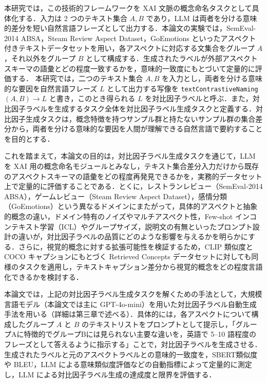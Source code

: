 本研究では，この技術的フレームワークを XAI 文脈の概念命名タスクとして具体化する．入力は 2 つのテキスト集合 $A,B$ であり，LLM は両者を分ける意味的差分を短い自然言語フレーズとして出力する．本論文の実験では，SemEval-2014 ABSA，Steam Review Aspect Dataset，GoEmotions といったアスペクト付きテキストデータセットを用い，各アスペクトに対応する文集合をグループ $A$，それ以外をグループ $B$ として構成する．生成されたラベルが外部アスペクトスキーマの語彙とどの程度一致するかを，意味的一致度にもとづいて定量的に評価する．
本研究では，二つのテキスト集合 $A,B$ を入力とし，両者を分ける意味的な要因を自然言語フレーズ $L$ として出力する写像を \texttt{textContrastiveNaming}$(A,B) \to L$ と書き，このとき得られる $L$ を対比因子ラベルと呼ぶ．また，対比因子ラベルを生成するタスク全体を対比因子ラベル生成タスクと定義する．対比因子生成タスクは，概念特徴を持つサンプル群と持たないサンプル群の集合差分から，両者を分ける意味的な要因を人間が理解できる自然言語で要約することを目的とする．

これを踏まえて，本論文の目的は，対比因子ラベル生成タスクを通じて，LLM を XAI 用の概念命名モジュールとみなし，テキスト集合差分入力だけから既存のアスペクトスキーマの語彙をどの程度再発見できるかを，実務的データセット上で定量的に評価することである．とくに，レストランレビュー（SemEval-2014 ABSA），ゲームレビュー（Steam Review Aspect Dataset），感情分類（GoEmotions）という異なるドメインにまたがって，具体的アスペクトと抽象的概念の違い，ドメイン特有のノイズやマルチアスペクト性，Few-shot インコンテキスト学習（ICL）やグループサイズ，説明文の有無といったプロンプト設計の違いが，対比因子ラベルの品質にどのような影響を与えるかを明らかにする．さらに，視覚的概念に対する拡張可能性を検証するため，CLIP 類似度と COCO キャプションにもとづく Retrieved Concepts データセットに対しても同様のタスクを適用し，テキストキャプション差分から視覚的概念をどの程度言語化できるかを検討する．

本論文では，上記の対比因子ラベル生成タスクを解くための手法として，大規模言語モデル（本論文では主に GPT-4o-mini）を用いた対比因子ラベル自動生成手法を用いる（詳細は第三章で述べる）．具体的には，各アスペクトについて構成したグループ $A$ と $B$ のテキストリストをプロンプトとして提示し，「グループAに特徴的でグループBには見られない主要な違いを，英語で 5--10 語程度のフレーズとして答えるように指示する」ことで，対比因子ラベルを生成させる．生成されたラベルと元のアスペクトラベルとの意味的一致度を，SBERT類似度 や BLEU，LLM による意味類似度評価などの自動指標によって定量的に測定し，LLM による対比因子ラベル生成の達成度と限界を評価する．

